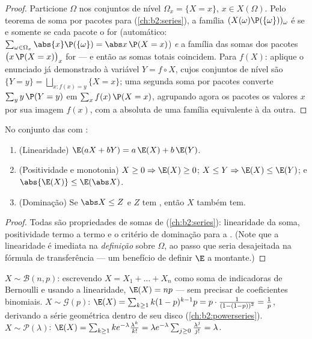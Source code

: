 \begin{proof}
Particione $\Omega$ nos conjuntos de nível $\Omega_x = \{X = x\}$, $x
\in X(\Omega)$. Pelo teorema de soma por pacotes para 
(\cref{ch:b2:series}), a família
$(X(\omega)\P(\{\omega\}))_\omega$ é  se e somente se cada pacote o for
(automático: $\sum_{\omega \in \Omega_x}\abs{x}\P(\{\omega\}) =
\abs x\,\P(X = x)$) \emph{e} a família das somas dos pacotes
$\bigl(x\,\P(X = x)\bigr)_x$ for  --- e então as somas
totais coincidem. Para $f(X)$: aplique o enunciado já demonstrado à variável $Y =
f \circ X$, cujos conjuntos de nível são $\{Y = y\} =
\bigsqcup_{x : f(x) = y}\{X = x\}$; uma segunda soma por
pacotes converte $\sum_y y\,\P(Y = y)$ em $\sum_x
f(x)\,\P(X = x)$, agrupando agora os pacotes os valores $x$
por sua imagem $f(x)$, com a  absoluta de uma
família equivalente à da outra.
\end{proof}

\begin{theorem}\label{thm:b2:randomvar:linearity}
No conjunto das  com :
\begin{enumerate}
\item (Linearidade) $\E(aX + bY) = a\,\E(X) + b\,\E(Y)$.
\item (Positividade e monotonia) $X \geq 0 \Rightarrow \E(X)
\geq 0$; $X \leq Y \Rightarrow \E(X) \leq \E(Y)$; e
$\abs{\E(X)} \leq \E(\abs X)$.
\item (Dominação) Se $\abs X \leq Z$ e $Z$ tem ,
então $X$ também tem.
\end{enumerate}
\end{theorem}

\begin{proof}
Todas são propriedades de somas de 
(\cref{ch:b2:series}): linearidade da soma, positividade termo a
termo e o critério de dominação para a . (Note que a
linearidade é imediata na \emph{definição} sobre $\Omega$,
ao passo que seria desajeitada na fórmula de transferência --- um benefício
de definir $\E$ a montante.)
\end{proof}

\begin{example}\label{ex:b2:randomvar:expectations}
$X \sim \mathcal{B}(n, p)$: escrevendo $X = X_1 + \dots + X_n$ como
soma de indicadoras de Bernoulli e usando a linearidade, $\E(X) = np$ ---
sem precisar de coeficientes binomiais. $X \sim \mathcal{G}(p)$: $\E(X) =
\sum_{k\geq1}k(1-p)^{k-1}p = p\cdot\frac{1}{(1 - (1-p))^2} =
\frac1p$, derivando a série geométrica dentro de seu disco
(\cref{ch:b2:powerseries}). $X \sim \mathcal{P}(\lambda)$: $\E(X)
= \sum_{k\geq1}k e^{-\lambda}\frac{\lambda^k}{k!} = \lambda
e^{-\lambda}\sum_{j\geq0}\frac{\lambda^j}{j!} = \lambda$.
\end{example}

